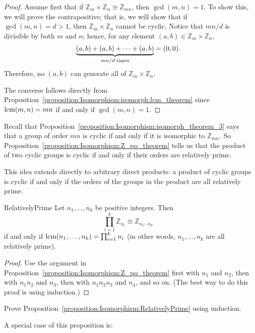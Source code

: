 \begin{proof}
Assume first that if ${\mathbb Z}_m \times {\mathbb Z}_n \cong {\mathbb
Z}_{mn}$, then $\gcd(m, n) = 1$. To show this, we will prove the
contrapositive; that is, we will show that if $\gcd(m, n) = d >
1$, then ${\mathbb Z}_m \times {\mathbb Z}_n$ cannot be cyclic. Notice that
$mn/d$ is divisible by both $m$ and $n$; hence, for any element $(a,b)
\in {\mathbb Z}_m \times {\mathbb Z}_n$,  
\[
\underbrace{(a,b) + (a,b)+ \cdots + (a,b)}_{mn/d \; {\rm
times}}
= (0, 0).
\]
Therefore, no $(a, b)$ can generate all of ${\mathbb Z}_m \times {\mathbb
Z}_n$. 

 
The converse follows directly from Proposition~\ref{proposition:Isomorphism:isomorph:lcm_theorem} since
$\operatorname{lcm}(m,n) = mn$ if and only if $\gcd(m,n)=1$. 
\end{proof}

Recall that Proposition~\ref{proposition:Isomorphism:isomorph_theorem_3} says that a group of order $mn$ is cyclic if and only if  it is isomorphic to ${\mathbb Z_{mn}}$.  So Proposition~\ref{proposition:Isomorphism:Z_pq_theorem} tells us that the product of two cyclic groups is cyclic if and only if their orders are relatively prime.
\medskip 

This idea extends directly to arbitrary direct products: a product of cyclic groups is cyclic if and only if the 
orders of the groups in the product are all relatively prime.

\begin{prop}{RelativelyPrime}
Let $n_1, \ldots, n_k$ be positive integers. Then
\[
\prod_{i=1}^k {\mathbb Z}_{n_i} \cong {\mathbb Z}_{n_1 \cdots n_k}
\]
if and only if $\operatorname{lcm}( n_1, \ldots, n_k) =\prod_{i=1}^k n_i$ (in other words, $n_1, \ldots, n_k$ are all relatively prime).
\end{prop}

\begin{proof}
Use the argument in Proposition~\ref{proposition:Isomorphism:Z_pq_theorem} first with $n_1$ and $n_2$, then with $n_1n_2$ and $n_3$,
then with $n_1n_2n_3$ and $n_4$, and so on. (The best way to do this proof is using induction.)
\end{proof}

\begin{exercise}{}
Prove Proposition~\ref{proposition:Isomorphism:RelativelyPrime} using induction.
\end{exercise}

A special case of this proposition is:
 
